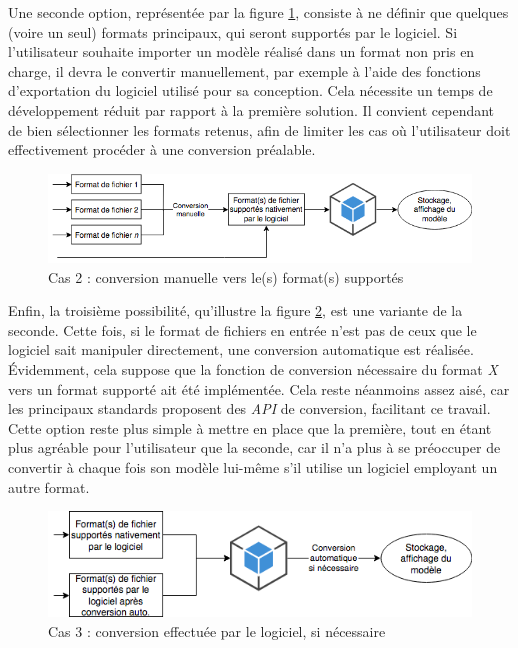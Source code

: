 Une seconde option, représentée par la figure \ref{fig:file-importation-process-manual-conversion}, consiste à ne définir que quelques (voire un seul) formats principaux, qui seront supportés par le logiciel. Si l'utilisateur souhaite importer un modèle réalisé dans un format non pris en charge, il devra le convertir manuellement, par exemple à l'aide des fonctions d'exportation du logiciel utilisé pour sa conception. Cela nécessite un temps de développement réduit par rapport à la première solution. Il convient cependant de bien sélectionner les formats retenus, afin de limiter les cas où l'utilisateur doit effectivement procéder à une conversion préalable.

\begin{figure}[ht]
    \centering
    \includegraphics[width=0.9\linewidth]{Figures/file-importation-process-manual-conversion.png}
    \caption{Cas 2 : conversion manuelle vers le(s) format(s) supportés}
    \label{fig:file-importation-process-manual-conversion}
\end{figure}

Enfin, la troisième possibilité, qu'illustre la figure \ref{fig:file-importation-process-auto-conversion}, est une variante de la seconde. Cette fois, si le format de fichiers en entrée n'est pas de ceux que le logiciel sait manipuler directement, une conversion automatique est réalisée. Évidemment, cela suppose que la fonction de conversion nécessaire du format \textit{X} vers un format supporté ait été implémentée. Cela reste néanmoins assez aisé, car les principaux standards proposent des \textit{API} de conversion, facilitant ce travail. Cette option reste plus simple à mettre en place que la première, tout en étant plus agréable pour l'utilisateur que la seconde, car il n'a plus à se préoccuper de convertir à chaque fois son modèle lui-même s'il utilise un logiciel employant un autre format.

\begin{figure}[ht]
    \centering
    \includegraphics[width=0.8\linewidth]{Figures/file-importation-process-auto-conversion.png}
    \caption{Cas 3 : conversion effectuée par le logiciel, si nécessaire}
    \label{fig:file-importation-process-auto-conversion}
\end{figure}

